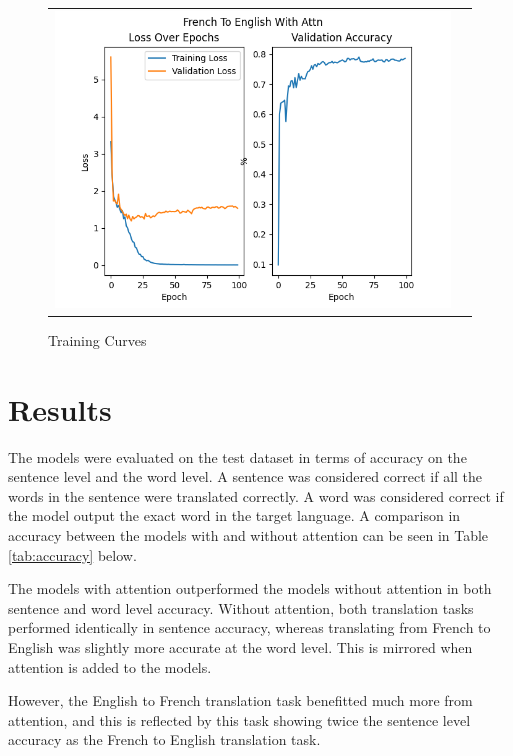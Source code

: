 \documentclass{article}
\begin{document}
\begin{figure}[htb]
\begin{tabularx}{\textwidth}{XX}
      \includegraphics{plots/fr2en_attn.png} \\
    \end{tabularx}
    \caption{Training Curves}
    \label{fig:losses}
\end{figure}


\section{Results}
The models were evaluated on the test dataset in terms of
accuracy on the sentence level and the word level. A
sentence was considered correct if all the words in the
sentence were translated correctly. A word was considered
correct if the model output the exact word in the target
language. A comparison in accuracy between the models with
and without attention can be seen in Table
\ref{tab:accuracy} below. 

The models with attention outperformed the models without
attention in both sentence and word level accuracy. Without
attention, both translation tasks performed identically in
sentence accuracy, whereas translating from French to
English was slightly more accurate at the word level. This
is mirrored when attention is added to the models.

However, the English to French translation task benefitted
much more from attention, and this is reflected by this task
showing twice the sentence level accuracy as the French to
English translation task.
\end{document}
